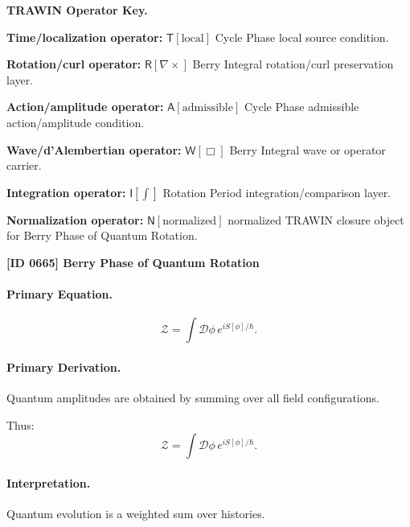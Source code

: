 \par\vspace{0.45\baselineskip}
\noindent\begin{minipage}[t]{\linewidth}
\begingroup
\small
\raggedright
\textbf{TRAWIN Operator Key.}\par
\noindent\textbf{Time/localization operator:} $\mathsf{T}\!\left[\mathrm{local}\right]$ Cycle Phase local source condition.\par
\noindent\textbf{Rotation/curl operator:} $\mathsf{R}\!\left[\nabla\times\right]$ Berry Integral rotation/curl preservation layer.\par
\noindent\textbf{Action/amplitude operator:} $\mathsf{A}\!\left[\mathrm{admissible}\right]$ Cycle Phase admissible action/amplitude condition.\par
\noindent\textbf{Wave/d'Alembertian operator:} $\mathsf{W}\!\left[\Box\right]$ Berry Integral wave or operator carrier.\par
\noindent\textbf{Integration operator:} $\mathsf{I}\!\left[\int\right]$ Rotation Period integration/comparison layer.\par
\noindent\textbf{Normalization operator:} $\mathsf{N}\!\left[\mathrm{normalized}\right]$ normalized TRAWIN closure object for Berry Phase of Quantum Rotation.\par
\endgroup
\end{minipage}

\clearpage
\noindent\textbf{[ID 0665] Berry Phase of Quantum Rotation}\par
\vspace{0.35em}
\paragraph{Primary Equation.}
\begin{equation}
\mathcal{Z}
=
\int \mathcal{D}\phi \, e^{iS[\phi]/\hbar}.
\end{equation}

\paragraph{Primary Derivation.}
Quantum amplitudes are obtained by summing over all field configurations.

Thus:
\begin{equation}
\boxed{
\mathcal{Z}
=
\int \mathcal{D}\phi \, e^{iS[\phi]/\hbar}.
}
\end{equation}

\paragraph{Interpretation.}
Quantum evolution is a weighted sum over histories.

